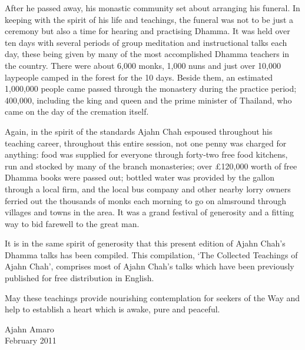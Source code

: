 After he passed away, his monastic community set about arranging his funeral. In keeping with the spirit of his life and teachings, the funeral was not to be just a ceremony but also a time for hearing and practising Dhamma. It was held over ten days with several periods of group meditation and instructional talks each day, these being given by many of the most accomplished Dhamma teachers in the country. There were about 6,000 monks, 1,000 nuns and just over 10,000 laypeople camped in the forest for the 10 days. Beside them, an estimated 1,000,000 people came passed through the monastery during the practice period; 400,000, including the king and queen and the prime minister of Thailand, who came on the day of the cremation itself.

Again, in the spirit of the standards Ajahn Chah espoused throughout his teaching career, throughout this entire session, not one penny was charged for anything: food was supplied for everyone through forty-two free food kitchens, run and stocked by many of the branch monasteries; over \pounds 120,000 worth of free Dhamma books were passed out; bottled water was provided by the gallon through a local firm, and the local bus company and other nearby lorry owners ferried out the thousands of monks each morning to go on almsround through villages and towns in the area. It was a grand festival of generosity and a fitting way to bid farewell to the great man.

It is in the same spirit of generosity that this present edition of Ajahn Chah's Dhamma talks has been compiled. This compilation, `The Collected Teachings of Ajahn Chah', comprises most of Ajahn Chah's talks which have been previously published for free distribution in English. 

May these teachings provide nourishing contemplation for seekers of the Way and help to establish a heart which is awake, pure and peaceful.
\vspace*{2\baselineskip}

{\raggedleft\par Ajahn Amaro\\
February 2011 \par}
